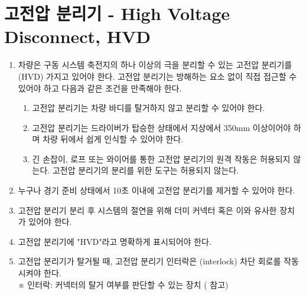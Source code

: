 \documentclass[final,a4paper,10pt]{report}
\begin{document}
\section{고전압 분리기 - High Voltage Disconnect, HVD}\label{rule:formula-technical.high-voltage-disconnect}
\begin{enumerate}
  \item\label{rule:formula-technical.high-voltage-disconnect.mandatory-and-accessible} 차량은 구동 시스템 축전지의 하나 이상의 극을 분리할 수 있는 고전압 분리기를(HVD) 가지고 있어야 한다. 고전압 분리기는 방해하는 요소 없이 직접 접근할 수 있어야 하고 다음과 같은 조건을 만족해야 한다.
    \begin{enumerate}
      \item\label{rule:formula-technical.high-voltage-disconnect.mandatory-and-accessible.without-body-removal} 고전압 분리기는 차량 바디를 탈거하지 않고 분리할 수 있어야 한다.
      \item\label{rule:formula-technical.high-voltage-disconnect.mandatory-and-accessible.min-height-350mm} 고전압 분리기는 드라이버가 탑승한 상태에서 지상에서 350mm 이상이어야 하며 차량 뒤에서 쉽게 인식할 수 있어야 한다.
      \item\label{rule:formula-technical.high-voltage-disconnect.mandatory-and-accessible.no-remote-actuation-tools} 긴 손잡이, 로프 또는 와이어를 통한 고전압 분리기의 원격 작동은 허용되지 않는다. 고전압 분리기의 분리를 위한 도구는 허용되지 않는다.
    \end{enumerate}

  \item\label{rule:formula-technical.high-voltage-disconnect.removable-in-10s} 누구나 경기 준비 상태에서 10초 이내에 고전압 분리기를 제거할 수 있어야 한다.
  \item\label{rule:formula-technical.high-voltage-disconnect.dummy-connector-for-insulation} 고전압 분리기 분리 후 시스템의 절연을 위해 더미 커넥터 혹은 이와 유사한 장치가 있어야 한다.
  \item\label{rule:formula-technical.high-voltage-disconnect.hvd-label} 고전압 분리기에 "HVD"라고 명확하게 표시되어야 한다.
  \item\label{rule:formula-technical.high-voltage-disconnect.interlock-trips-shutdown-circuit} 고전압 분리기가 탈거될 때, 고전압 분리기 인터락은 (interlock) 차단 회로를 작동시켜야 한다.\\
    ※ 인터락: 커넥터의 탈거 여부를 판단할 수 있는 장치 ( 참고)
\end{enumerate}
\end{document}
